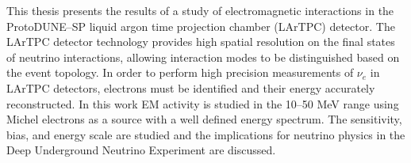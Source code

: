 This thesis presents the results of a study of electromagnetic interactions in 
the ProtoDUNE--SP liquid argon time projection chamber (LArTPC) detector.  The 
LArTPC detector technology provides high spatial resolution on the final states 
of neutrino interactions, allowing interaction modes to be distinguished based 
on the event topology. In order to perform high precision measurements of 
\(\nu_e\) in LArTPC detectors, electrons must be identified and their energy 
accurately reconstructed. In this work EM activity is studied in the 10--50 MeV 
range using Michel electrons as a source with a well defined energy spectrum. 
The sensitivity, bias, and energy scale are studied and the implications for 
neutrino physics in the Deep Underground Neutrino Experiment are discussed.

